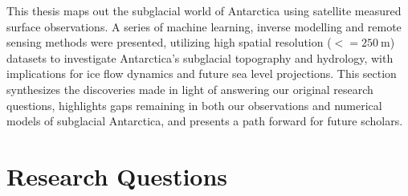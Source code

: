 
This thesis maps out the subglacial world of Antarctica using satellite measured surface observations.
A series of machine learning, inverse modelling and remote sensing methods were presented, utilizing high spatial resolution ($<= \SI{250}{\metre}$) datasets to investigate Antarctica's subglacial topography and hydrology, with implications for ice flow dynamics and future sea level projections.
This section synthesizes the discoveries made in light of answering our original research questions, highlights gaps remaining in both our observations and numerical models of subglacial Antarctica, and presents a path forward for future scholars.

\section{Research Questions}

